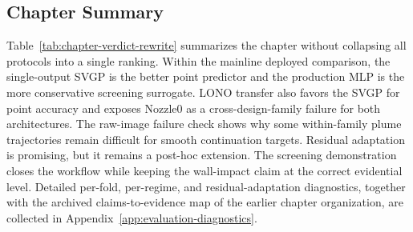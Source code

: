 \FloatBarrier

\subsection{Chapter Summary}
\label{sec:results-summary-rewrite}

Table~\ref{tab:chapter-verdict-rewrite} summarizes the chapter without
collapsing all protocols into a single ranking. Within the mainline deployed
comparison, the single-output SVGP is the better point predictor and the
production MLP is the more conservative screening surrogate. LONO transfer also
favors the SVGP for point accuracy and exposes Nozzle0 as a cross-design-family
failure for both architectures. The raw-image failure check shows why some
within-family plume trajectories remain difficult for smooth continuation
targets. Residual adaptation is promising, but it remains a post-hoc extension.
The screening demonstration closes the workflow while keeping the wall-impact
claim at the correct evidential level. Detailed per-fold, per-regime, and
residual-adaptation diagnostics, together with the archived claims-to-evidence
map of the earlier chapter organization, are collected in
Appendix~\ref{app:evaluation-diagnostics}.

